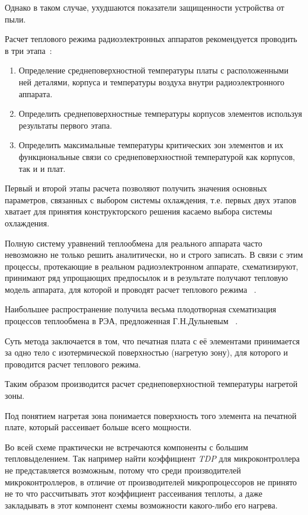 Однако в таком случае, ухудшаются показатели защищенности устройства
от пыли.

Расчет теплового режима радиоэлектронных аппаратов рекомендуется
проводить в три этапа~\cite{Rotkop1976}:
\begin{enumerate}[label={\arabic*.}]
  \item Определение среднеповерхностной температуры платы с
расположенными ней деталями, корпуса и температуры воздуха внутри
радиоэлектронного аппарата.
  \item Определить среднеповерхностные температуры корпусов элементов
  используя результаты первого этапа.
  \item Определить максимальные температуры критических зон элементов и
их функциональные связи со среднеповерхностной температурой как
корпусов, так и и плат.
\end{enumerate}

Первый и второй этапы расчета позволяют получить значения основных
параметров, связанных с выбором системы охлаждения, т.е. первых двух
этапов хватает для принятия конструкторского решения касаемо выбора
системы охлаждения.

Полную систему уравнений теплообмена для реального аппарата часто
невозможно не только решить аналитически, но и строго записать. В
связи с этим процессы, протекающие в реальном радиоэлектронном
аппарате, схематизируют, принимают ряд упрощающих предпосылок и в
результате получают тепловую модель аппарата, для которой и проводят
расчет теплового режима ~\cite{Rotkop1976}.

Наибольшее распространение получила весьма плодотворная схематизация
процессов теплообмена в РЭА, предложенная Г.Н.Дульневым
~\cite{Dulnev1968}.

Суть метода заключается в том, что печатная плата с её элементами
принимается за одно тело с изотермической поверхностью (нагретую
зону), для которого и проводится расчет теплового режима.

Таким образом производится расчет среднеповерхностной температуры
нагретой зоны.

Под понятием нагретая зона понимается поверхность того элемента на
печатной плате, который рассеивает больше всего мощности.

Во всей схеме практически не встречаются компоненты с большим
тепловыделением. Так например найти коэффициент \textit{TDP} для
микроконтроллера не представляется возможным, потому что среди
производителей микроконтроллеров, в отличие от производителей
микропроцессоров не принято не то что рассчитывать этот коэффициент
рассеивания теплоты, а даже закладывать в этот компонент схемы
возможности какого-либо его нагрева.

